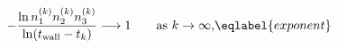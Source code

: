 \begin{equation}
- \frac{\ln n_1^{(k)} n_2^{(k)} n_3^{(k)}}{\ln(t_{\rm
wall}-t_k)} \longrightarrow 1 \qquad \text{as $k\to\infty$,}
\eqlabel{exponent}
\end{equation}

